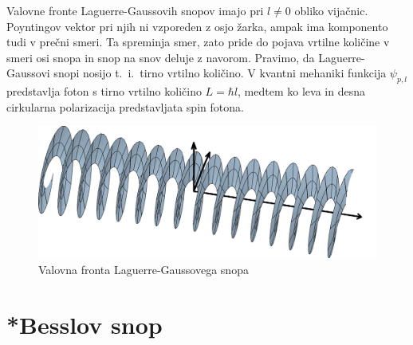 \begin{remark}
Valovne fronte Laguerre-Gaussovih snopov imajo pri $l\ne0$  obliko vijačnic. 
Poyntingov vektor 
pri njih ni vzporeden z osjo žarka, ampak ima komponento tudi v prečni smeri. Ta spreminja smer, 
zato pride do pojava vrtilne količine v smeri osi snopa in snop na snov deluje z navorom. 
Pravimo, da Laguerre-Gaussovi snopi nosijo t.\ i.\ tirno vrtilno količino. 
V kvantni mehaniki funkcija $\psi_{p,l}$ predstavlja foton s tirno vrtilno količino $L = \hbar l$, 
medtem ko leva in desna cirkularna polarizacija predstavljata spin fotona. 
\begin{figure}[h]
\centering
\includegraphics[width=10truecm]{slike/03_Laguerre_faza.png}
\caption{Valovna fronta Laguerre-Gaussovega snopa}
\label{fig:Laguerrova_fronta}
\end{figure}
\end{remark}

\section{*Besslov snop}

